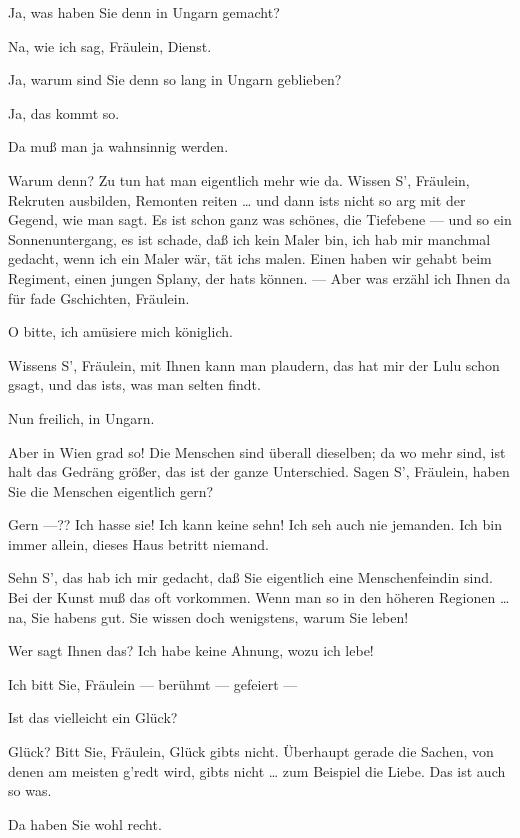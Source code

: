 \documentclass[
	final,
	a4paper,
	ngerman,
	mpinclude = true, %
	twoside = true,
	open = right,
	cleardoublepage = plain,
	DIV = 13,
	BCOR = 1cm,
	titlepage = firstiscover,
	]{scrbook}
\newcommand{\thecharacter}[1]{\textup{\textsc{#1}}\xspace}
\newcommand{\theschauspielerin}{\thecharacter{Schauspielerin}}
\newcommand{\thegraf}{\thecharacter{Graf}}
\newcommand{\character}[1]{\item[#1:]}
\newcommand{\schauspielerin}{\character{\theschauspielerin}}
\newcommand{\graf}{\character{\thegraf}}
\begin{document}
\begin{play}
	\schauspielerin
	Ja, was haben Sie denn in Ungarn gemacht?

	\graf
	Na, wie ich sag, Fräulein, Dienst.

	\schauspielerin
	Ja, warum sind Sie denn so lang in Ungarn geblieben?

	\graf
	Ja, das kommt so.

	\schauspielerin
	Da muß man ja wahnsinnig werden.

	\graf
	Warum denn? Zu tun hat man eigentlich mehr wie da. Wissen S', Fräulein, Rekruten ausbilden, Remonten reiten \ldots{} und dann ists nicht so arg mit der Gegend, wie man sagt. Es ist schon ganz was schönes, die Tiefebene --- und so ein Sonnenuntergang, es ist schade, daß ich kein Maler bin, ich hab mir manchmal gedacht, wenn ich ein Maler wär, tät ichs malen. Einen haben wir gehabt beim Regiment, einen jungen Splany, der hats können. --- Aber was erzähl ich Ihnen da für fade Gschichten, Fräulein.

	\schauspielerin
	O bitte, ich amüsiere mich königlich.

	\graf
	Wissens S', Fräulein, mit Ihnen kann man plaudern, das hat mir der Lulu schon gsagt, und das ists, was man selten findt.

	\schauspielerin
	Nun freilich, in Ungarn.

	\graf
	Aber in Wien grad so! Die Menschen sind überall dieselben; da wo mehr sind, ist halt das Gedräng größer, das ist der ganze Unterschied. Sagen S', Fräulein, haben Sie die Menschen eigentlich gern?

	\schauspielerin
	Gern ---?? Ich hasse sie! Ich kann keine sehn! Ich seh auch nie jemanden. Ich bin immer allein, dieses Haus betritt niemand.

	\graf
	Sehn S', das hab ich mir gedacht, daß Sie eigentlich eine Menschenfeindin sind. Bei der Kunst muß das oft vorkommen. Wenn man so in den höheren Regionen \ldots{} na, Sie habens gut. Sie wissen doch wenigstens, warum Sie leben!

	\schauspielerin
	Wer sagt Ihnen das? Ich habe keine Ahnung, wozu ich lebe!

	\graf
	Ich bitt Sie, Fräulein --- berühmt --- gefeiert ---

	\schauspielerin
	Ist das vielleicht ein Glück?

	\graf
	Glück? Bitt Sie, Fräulein, Glück gibts nicht. Überhaupt gerade die Sachen, von denen am meisten g'redt wird, gibts nicht \ldots{} zum Beispiel die Liebe. Das ist auch so was.

	\schauspielerin
	Da haben Sie wohl recht.


\end{play}
\end{document}

